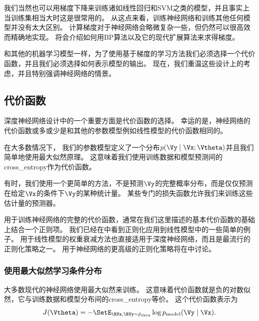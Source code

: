 
我们当然也可以用梯度下降来训练诸如线性回归和\gls{SVM}之类的模型，并且事实上当训练集相当大时这是很常用的。
从这点来看，训练神经网络和训练其他任何模型并没有太大区别。
计算梯度对于神经网络会略微复杂一些，但仍然可以很高效而精确地实现。
将会介绍如何用\gls{BP}算法以及它的现代扩展算法来求得梯度。

和其他的机器学习模型一样，为了使用基于梯度的学习方法我们必须选择一个代价函数，并且我们必须选择如何表示模型的输出。
现在，我们重温这些设计上的考虑，并且特别强调神经网络的情景。

\subsection{代价函数}
\label{sec:cost_functions}

深度神经网络设计中的一个重要方面是代价函数的选择。
幸运的是，神经网络的代价函数或多或少是和其他的参数模型例如线性模型的代价函数相同的。

在大多数情况下， 我们的参数模型定义了一个分布$p(\Vy\mid\Vx;\Vtheta)$并且我们简单地使用最大似然原理。
这意味着我们使用训练数据和模型预测间的\gls{cross_entropy}作为代价函数。

有时，我们使用一个更简单的方法，不是预测$\Vy$的完整概率分布，而是仅仅预测在给定$\Vx$的条件下$\Vy$的某种统计量。
某些专门的损失函数允许我们来训练这些估计量的预测器。

用于训练神经网络的完整的代价函数，通常在我们这里描述的基本代价函数的基础上结合一个正则项。
我们已经在中看到正则化应用到线性模型中的一些简单的例子。
用于线性模型的权重衰减方法也直接适用于深度神经网络，而且是最流行的正则化策略之一。
用于神经网络的更高级的正则化策略将在中讨论。


\subsubsection{使用最大似然学习条件分布}
\label{sec:learning_conditional_distributions_with_maximum_likelihood}

大多数现代的神经网络使用最大似然来训练。
这意味着代价函数就是负的对数似然，它与训练数据和模型分布间的\gls{cross_entropy}等价。
这个代价函数表示为
\begin{equation}
J(\Vtheta) = -\SetE_{\RVx, \RVy \sim \hat{p}_\text{data}} \log p_\text{model} (\Vy \mid \Vx).
\end{equation}

